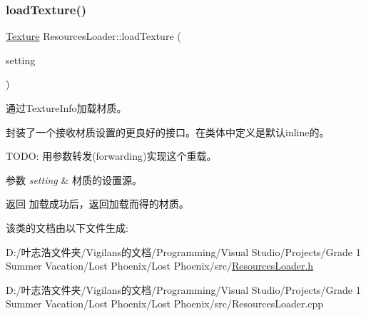 \subsubsection{\texorpdfstring{load\+Texture()}{loadTexture()}\hspace{0.1cm}{\footnotesize\ttfamily [2/2]}}
{\footnotesize\ttfamily \hyperlink{struct_texture}{Texture} Resources\+Loader\+::load\+Texture (\begin{DoxyParamCaption}\item[{\hyperlink{struct_settings_1_1_texture_info}{Settings\+::\+Texture\+Info}}]{setting }\end{DoxyParamCaption})\hspace{0.3cm}{\ttfamily [inline]}}



通过Texture\+Info加载材质。 

封装了一个接收材质设置的更良好的接口。在类体中定义是默认inline的。

T\+O\+DO\+: 用参数转发(forwarding)实现这个重载。 


\begin{DoxyParams}{参数}
{\em setting} & 材质的设置源。 \\
\hline
\end{DoxyParams}
\begin{DoxyReturn}{返回}
加载成功后，返回加载而得的材质。 
\end{DoxyReturn}


该类的文档由以下文件生成\+:\begin{DoxyCompactItemize}
\item 
D\+:/叶志浩文件夹/\+Vigilans的文档/\+Programming/\+Visual Studio/\+Projects/\+Grade 1 Summer Vacation/\+Lost Phoenix/\+Lost Phoenix/src/\hyperlink{_resources_loader_8h}{Resources\+Loader.\+h}\item 
D\+:/叶志浩文件夹/\+Vigilans的文档/\+Programming/\+Visual Studio/\+Projects/\+Grade 1 Summer Vacation/\+Lost Phoenix/\+Lost Phoenix/src/Resources\+Loader.\+cpp\end{DoxyCompactItemize}
